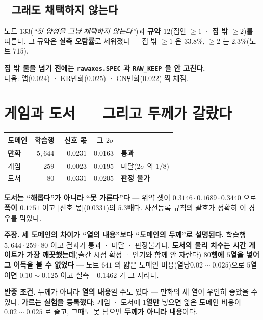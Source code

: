 \documentclass[10pt,a4paper]{article}
\newcommand{\claim}[2]{\begin{claimbox}\textbf{주장.} #1\par\smallskip
  \textcolor{gray!70}{\textbf{반증 조건.} #2}\end{claimbox}}
\begin{document}
\subsection*{🔴 그래도 채택하지 않는다}

노트 $133$(\emph{``첫 양성을 그냥 채택하지 않는다''})과 \textbf{규약 $12$}(집안
$\geq 1$ · \textbf{집 밖 $\geq 2$})를 따른다. 그 규약은 \textbf{실측 오탐률}로
세워졌다 --- 집 밖 $\geq 1$ 은 $33.8\%$, $\geq 2$ 는 $2.3\%$(노트 $715$).

\begin{center}
\textbf{집 밖 둘을 넘기 전에는 \texttt{rawaxes.SPEC} 과 \texttt{RAW\_KEEP} 을 안
고친다.}\\
다음: 앱($0.024$) · KR만화($0.025$) · CN만화($0.022$) 짝 채점.
\end{center}

\section{게임과 도서 --- 그리고 두께가 갈랐다}

\begin{center}
\begin{tabular}{lrrrl}
\toprule
도메인 & 학습행 & 신호 몫 & 그 $2\sigma$ & \\
\midrule
\textbf{만화} & $5{,}644$ & $\mathbf{+0.0231}$ & $0.0163$ & \textbf{통과} \\
게임 & $259$ & $+0.0023$ & $0.0195$ & 미달($2\sigma$ 의 $1/8$) \\
도서 & $80$ & $-0.0331$ & $0.0205$ & \textbf{판정 불가} \\
\bottomrule
\end{tabular}
\end{center}

\textbf{도서는 ``해롭다''가 아니라 ``못 가른다''다} --- 위약 셋이 $0.3146 \cdot
0.1689 \cdot 0.3440$ 으로 \textbf{폭이 $0.1751$} 이고 $|$신호 몫$|$($0.0331$)의
\textbf{$5.3$배}다. 사전등록 규칙의 괄호가 정확히 이 경우를 막았다.

\claim{\textbf{세 도메인의 차이가 ``열의 내용''보다 ``도메인의 두께''로 설명된다.}
학습행 $5{,}644 \cdot 259 \cdot 80$ 이고 결과가 통과 · 미달 · 판정불가다.
\textbf{도서의 물리 치수는 시간 게이트가 가장 깨끗했는데}(출간 시점 확정 · 인기와 함께
안 자란다) \textbf{$80$행에 $5$열을 넣어 그 이득을 볼 수 없었다} --- 노트 $641$ 의
얇은 도메인 비용($열당 0.02{\sim}0.025$)으로 $5$열이면 $0.10{\sim}0.125$ 이고 실측
$-0.1462$ 가 그 자리다.}
{두께가 아니라 \textbf{열의 내용}일 수도 있다 --- 만화의 세 열이 우연히 좋았을 수 있다.
\textbf{가르는 실험을 등록했다}: 게임 · 도서에 \textbf{$1$열만} 넣으면 얇은 도메인
비용이 $0.02{\sim}0.025$ 로 줄고, 그때도 못 넘으면 \textbf{두께가 아니라 내용}이다.}
\end{document}
